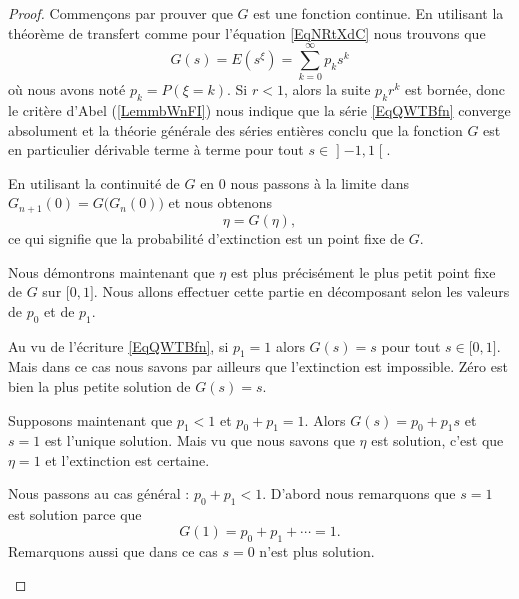 \begin{proof}
    Commençons par prouver que \( G\) est une fonction continue. En utilisant la théorème de transfert comme pour l'équation \eqref{EqNRtXdC} nous trouvons que
    \begin{equation}    \label{EqQWTBfn}
        G(s)=E(s^{\xi})=\sum_{k=0}^{\infty}p_ks^k
    \end{equation}
    où nous avons noté \( p_k=P(\xi=k)\). Si \( r<1\), alors la suite \( p_kr^k\) est bornée, donc le critère d'Abel (\ref{LemmbWnFI}) nous indique que la série \eqref{EqQWTBfn} converge absolument et la théorie générale des séries entières conclu que la fonction \( G\) est en particulier dérivable terme à terme pour tout \( s\in\mathopen] -1 , 1 \mathclose[\). 

    \begin{subproof}

        \item[Le probabilité d'extinction est un point fixe de \( G\)]

    En utilisant la continuité de \( G\) en \( 0\) nous passons à la limite dans \( G_{n+1}(0)=G\big( G_n(0) \big)\) et nous obtenons
    \begin{equation}
        \eta=G(\eta),
    \end{equation}
    ce qui signifie que la probabilité d'extinction est un point fixe de \( G\).

        \item[\( \eta\) est le plus petit point fixe de \( G\)] 

    Nous démontrons maintenant que \( \eta\) est plus précisément le plus petit point fixe de \( G\) sur \( \mathopen[ 0 , 1 \mathclose]\). Nous allons effectuer cette partie en décomposant selon les valeurs de \( p_0\) et de \( p_1\).

    Au vu de l'écriture \eqref{EqQWTBfn}, si \( p_1=1\) alors \( G(s)=s\) pour tout \( s\in\mathopen[ 0 , 1 \mathclose]\). Mais dans ce cas nous savons par ailleurs que l'extinction est impossible.  Zéro est bien la plus petite solution de \( G(s)=s\).

    Supposons maintenant que \( p_1<1\) et \( p_0+p_1=1\). Alors \( G(s)=p_0+p_1s\) et \( s=1\) est l'unique solution. Mais vu que nous savons que \( \eta\) est solution, c'est que \( \eta=1\) et l'extinction est certaine. 

    Nous passons au cas général : \( p_0+p_1<1\). D'abord nous remarquons que \( s=1\) est solution parce que 
    \begin{equation}
        G(1)=p_0+p_1+\cdots=1.
    \end{equation}
    Remarquons aussi que dans ce cas \( s=0\) n'est plus solution.


\end{subproof}
\end{proof}
